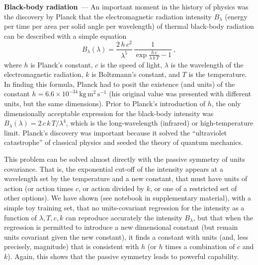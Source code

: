 \documentclass{article}
\newcommand{\unit}[1]{\mathrm{#1}}
\newcommand{\kg}{\unit{kg}}
\newcommand{\m}{\unit{m}}
\newcommand{\s}{\unit{s}}
\renewcommand{\paragraph}[1]{\par\textbf{#1}~---}
\begin{document}
\paragraph{Black-body radiation}
An important moment in the history of physics was the discovery by Planck that the electromagnetic radiation intensity $B_\lambda$ (energy per time per area per solid angle per wavelength) of thermal black-body radiation can be described with a simple equation \cite{planck}
\begin{equation}
    B_\lambda(\lambda) = \frac{2\,h\,c^2}{\lambda^5}\,\frac{1}{\exp\frac{h\,c}{\lambda\,k\,T} - 1}~,
\end{equation}
where $h$ is Planck's constant,
$c$ is the speed of light,
$\lambda$ is the wavelength of the electromagnetic radiation,
$k$ is Boltzmann's constant,
and $T$ is the temperature.
In finding this formula, Planck had to posit the existence (and units) of the constant $h=6.6\times 10^{-34}\,\kg\,\m^2\,\s^{-1}$ (his original value was presented with different units, but the same dimensions).
Prior to Planck's introduction of $h$, the only dimensionally acceptable expression for the black-body intensity was $B_\lambda(\lambda)=2\,c\,k\,T/\lambda^4$, which is the long-wavelength (infrared) or high-temperature limit.
Planck's discovery was important because it solved the ``ultraviolet catastrophe'' of classical physics and seeded the theory of quantum mechanics.

This problem can be solved almost directly with the passive symmetry of units covariance.
That is, the exponential cut-off of the intensity appears at a wavelength set by the temperature and a new constant, that must have units of action (or action times $c$, or action divided by $k$, or one of a restricted set of other options).
We have shown (see notebook in supplementary material), with a simple toy training set, that no units-covariant regression for the intensity as a function of $\lambda, T, c, k$ can reproduce accurately the intensity $B_\lambda$, but that when the regression is permitted to introduce a new dimensional constant (but remain units covariant given the new constant), it finds a constant with units (and, less precisely, magnitude) that is consistent with $h$ (or $h$ times a combination of $c$ and $k$).
Again, this shows that the passive symmetry leads to powerful capability.
\end{document}
